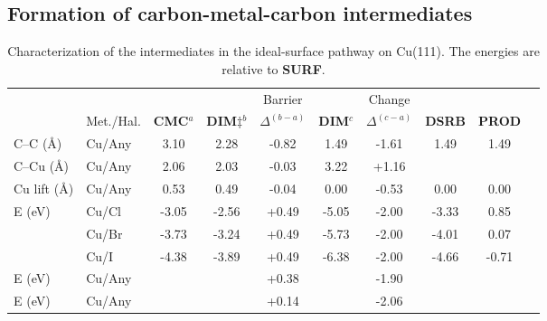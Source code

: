 \documentclass[aps,prb,reprint,amsmath,amssymb]{revtex4-1}
\begin{document}
\ifdefined\INTERAL
\subsection{Formation of carbon-metal-carbon intermediates}
\fi

\begin{table}
\centering
\caption{Characterization of the intermediates in the ideal-surface pathway on Cu(111). %
The energies are relative to \textbf{SURF}.
}
\label{table:idealsurface}
\begin{tabular}{ llcccccccc  }
 \hline
 \hline
  & & &  & Barrier & & Change & &\\
  & Met./Hal. & \textbf{CMC}$^{a}$ & \textbf{DIM$\ddagger$}$^{b}$ & $\Delta^{(b-a)}$ &  \textbf{DIM}$^{c}$ & $\Delta^{(c-a)}$  & \textbf{DSRB} & \textbf{PROD} \\ 
 \hline 
 C--C (\si{\angstrom}) & Cu/Any & 3.10 & 2.28 & -0.82 & 1.49 & -1.61 & 1.49 & 1.49 \\ 
 \hline
 C--Cu (\si{\angstrom}) & Cu/Any & 2.06 & 2.03 & -0.03 & 3.22 & +1.16 & & \\
 \hline
 Cu lift (\si{\angstrom}) & Cu/Any & 0.53 & 0.49& -0.04  & 0.00 & -0.53 & 0.00 & 0.00 \\
 \hline
 \multirow{3}{*}{E (\si{\electronvolt}) } & Cu/Cl & -3.05 &-2.56 &+0.49 & -5.05 & -2.00& -3.33&0.85\\ 
 & Cu/Br & -3.73 & -3.24 &+0.49 & -5.73 & -2.00& -4.01&0.07\\ 
 & Cu/I  & -4.38 & -3.89 & +0.49 & -6.38 & -2.00& -4.66&-0.71\\ 
 \hline
 E (\si{\electronvolt})~\cite{pccp2010} & Cu/Any &  &  & +0.38& & -1.90 & & \\
 \hline
 E (\si{\electronvolt})~\cite{jacs2013} & Cu/Any & &  & +0.14& & -2.06 & &\\
 \hline
 \hline
\end{tabular}
\end{table}
\end{document}
